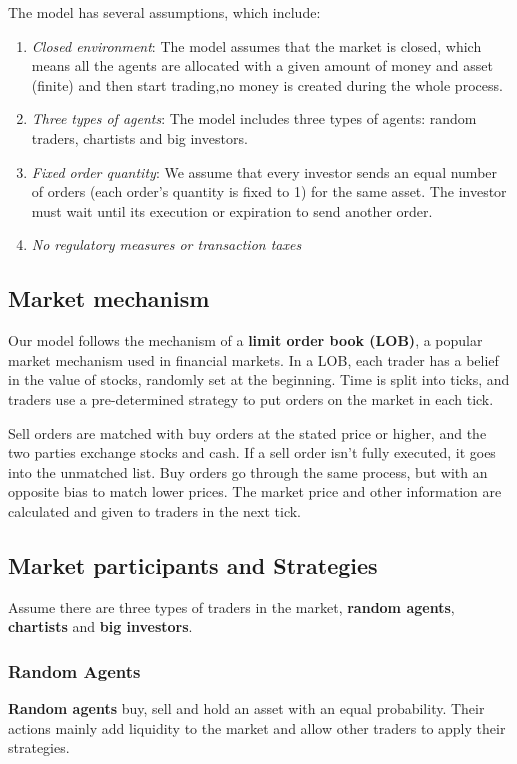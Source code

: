 \documentclass[a4paper, 12pt]{article}
\begin{document}
        The model has several assumptions, which include:
        \begin{enumerate}
            \item \emph{Closed environment}: The model assumes that the market is closed, which means all the agents are allocated with a given amount of money and asset (finite) and then start trading,no money is created during the whole process.
            \item \emph{Three types of agents}: The model includes three types of agents: random traders, chartists and big investors.
            \item \emph{Fixed order quantity}: We assume that every investor sends an equal number of orders (each order's quantity is fixed to 1) for the same asset. The investor must wait until its execution or expiration to send another order.
            \item \emph{No regulatory measures or transaction taxes}
            
        \end{enumerate}
        
    \subsection{Market mechanism}
        Our model follows the mechanism of a \textbf{limit order book (LOB)}, a popular market mechanism used in financial markets. In a LOB, each trader has a belief in the value of stocks, randomly set at the beginning. Time is split into ticks, and traders use a pre-determined strategy to put orders on the market in each tick.\par
        
        Sell orders are matched with buy orders at the stated price or higher, and the two parties exchange stocks and cash. If a sell order isn't fully executed, it goes into the unmatched list. Buy orders go through the same process, but with an opposite bias to match lower prices. The market price and other information are calculated and given to traders in the next tick.

    
    \subsection{Market participants and Strategies}
        Assume there are three types of traders in the market, \textbf{random agents}, \textbf{chartists} and \textbf{big investors}.
        \subsubsection{Random Agents}
            \textbf{Random agents} buy, sell and hold an asset with an equal probability. Their actions mainly add liquidity to the market and allow other traders to apply their strategies.
        
\end{document}
